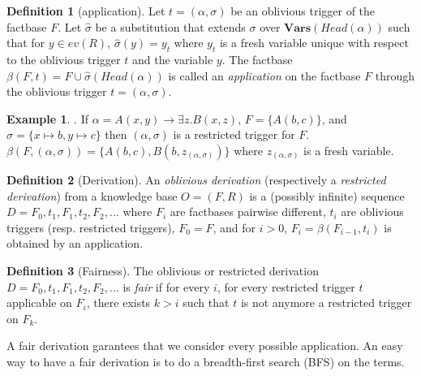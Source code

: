 \documentclass{article}
\theoremstyle{definition}
\newtheorem{definition}{Definition}[section]
\newtheorem{example}{Example}[section]
\theoremstyle{remark}
\newcommand{\Vars}{\textbf{Vars}}
\begin{document}
\begin{definition}[application]
Let $t = (\alpha,\sigma)$ be an oblivious trigger of the factbase $F$. Let $\hat \sigma$ be a substitution that extends $\sigma$ over $\Vars(\textit{Head}(\alpha))$ such that for $y \in \textit{ev}(R)$, $\hat \sigma(y) = y_t$ where $y_t$ is a fresh variable unique with respect to the oblivious trigger $t$ and the variable $y$.
The factbase $\beta(F,t)=F \cup \hat \sigma(\textit{Head}(\alpha))$ is called an \emph{application} on the factbase $F$ through the oblivious trigger $t = (\alpha,\sigma)$.
\end{definition}

\begin{example}. If $\alpha = A(x,y) \rightarrow \exists z.B(x,z)$, $F = \{A(b,c)\}$, and $\sigma = \{x \mapsto b, y \mapsto c \}$ then $(\alpha,\sigma)$ is a restricted trigger for $F$. $\beta(F,(\alpha,\sigma)) = \{A(b,c),B(b,z_{(\alpha,\sigma)})\}$ where $z_{(\alpha,\sigma)}$ is a fresh variable.
\end{example}

\begin{definition}[Derivation]
An \emph{oblivious derivation} (respectively a \emph{restricted derivation}) from a knowledge base $O= (F,R)$ is a (possibly infinite) sequence $D=F_0,t_1,F_1,t_2,F_2,...$ where $F_i$ are factbases pairwise different, $t_i$ are oblivious triggers (resp. restricted triggers), $F_0 = F$, and for $i >0$, $F_{i}= \beta(F_{i-1},t_i)$ is obtained by an application.
\end{definition}


\begin{definition}[Fairness]
The oblivious or restricted derivation $D=F_0,t_1,F_1,t_2,F_2,...$ is \emph{fair} if for every $i$, for every restricted trigger $t$ applicable on $F_i$, there exists $k > i$ such that $t$ is not anymore a restricted trigger on $F_k$.
\end{definition}

A fair derivation garantees that we consider every possible application. An easy way to have a fair derivation is to do a breadth-first search (BFS) on the terms.
\end{document}
